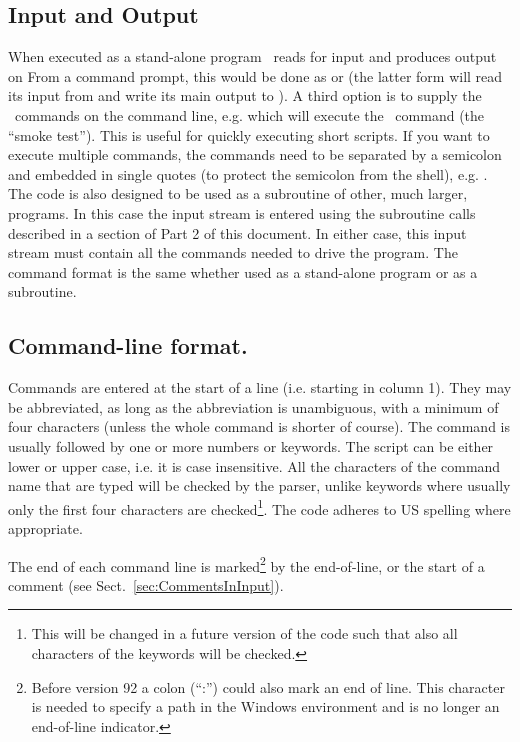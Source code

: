 \subsection{Input and Output}
When executed as a stand-alone program \Cloudy\ reads
 for input and produces output on 
From a command prompt, this
would be done as 
or  (the latter form will read its
input from  and write its main output to ).
A third option is to supply the \Cloudy\ commands on the command line, e.g.
 which will execute the \Cloudy\ command
 (the ``smoke test''). This is useful for quickly executing
short scripts. If you want to execute multiple commands, the commands need to be separated
by a semicolon and embedded in single quotes (to protect the semicolon from the shell), e.g.
.
The code is also designed
to be used as a subroutine of other, much larger, programs.
In this case the input stream is entered using
the subroutine calls described in a section of Part 2 of this document.
In either case, this input stream must contain all the commands needed to
drive the program.
The command format is the same whether used as a
stand-alone program or as a subroutine.

\subsection{Command-line format.}
\label{sec:CommandLineFormat}
Commands are entered at the start of a line (i.e. starting in column 1).
They may be abbreviated, as long as the abbreviation is unambiguous,
with a minimum of four characters (unless the whole command is shorter of course).
The command is usually followed by one or more
numbers or keywords.
The script can be either lower or upper case, i.e. it is case insensitive.
All the characters of the command name that are typed will be checked by the parser,
unlike keywords where usually only the first four characters are checked\footnote{This
will be changed in a future version of the code such that also all characters of the keywords will be checked.}.
The code adheres to US spelling where appropriate.

The end of each command line is marked\footnote{Before version 92 a colon (``:'') could also mark an end of line.
This character is needed to specify a path in the Windows environment and
is no longer an end-of-line indicator.} by the end-of-line, or the start of a comment
(see Sect.~\ref{sec:CommentsInInput}).

